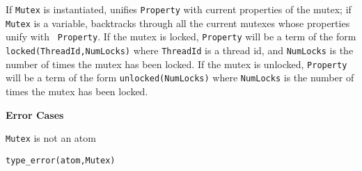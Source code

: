 \begin{description}
%
If {\tt Mutex} is instantiated, unifies {\tt Property} with current
properties of the mutex; if {\tt Mutex} is a variable, backtracks
through all the current mutexes whose properties unify with {\tt
  Property}.  If the mutex is locked, {\tt Property} will be a term of
the form {\tt locked(ThreadId,NumLocks)} where {\tt ThreadId} is a
thread id, and {\tt NumLocks} is the number of times the mutex has
been locked.  If the mutex is unlocked, {\tt Property} will be a term
of the form {\tt unlocked(NumLocks)} where {\tt NumLocks} is the
number of times the mutex has been locked.

{\bf Error Cases}
\bi
\item 	{\tt Mutex} is not an atom
\bi
\item 	{\tt type\_error(atom,Mutex)}
\ei
\ei

\end{description}


